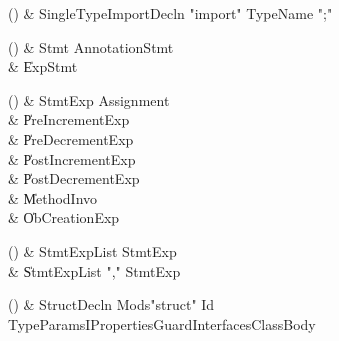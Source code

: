 \begin{bbgrammarappendix}{2.9in}

() & SingleTypeImportDecln \label{prod:SingleTypeImportDecln}  \: \xcd"import" TypeName \xcd";"  \\


\end{bbgrammarappendix}

\begin{bbgrammarappendix}{4.6in}

() & Stmt \label{prod:Stmt}  \: AnnotationStmt  \\

 &    \| ExpStmt \\

\end{bbgrammarappendix}

\begin{bbgrammarappendix}{4.3in}

() & StmtExp \label{prod:StmtExp}  \: Assignment  \\

 &    \| PreIncrementExp \\
 &    \| PreDecrementExp \\
 &    \| PostIncrementExp \\
 &    \| PostDecrementExp \\
 &    \| MethodInvo \\
 &    \| ObCreationExp \\

\end{bbgrammarappendix}

\begin{bbgrammarappendix}{3.9in}

() & StmtExpList \label{prod:StmtExpList}  \: StmtExp  \\

 &    \| StmtExpList \xcd"," StmtExp \\

\end{bbgrammarappendix}

\begin{bbgrammarappendix}{3.9in}

() & StructDecln \label{prod:StructDecln}  \: Mods\opt \xcd"struct" Id TypeParamsI\opt Properties\opt Guard\opt Interfaces\opt ClassBody  \\


\end{bbgrammarappendix}

